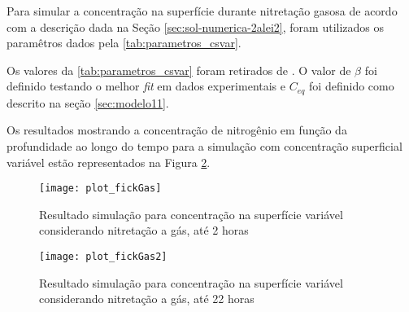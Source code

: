 Para simular a concentração na superfície durante nitretação gasosa de acordo com a descrição dada na Seção \autoref{sec:sol-numerica-2alei2}, foram utilizados os paramêtros dados pela \autoref{tab:parametros_csvar}.

\begin{table}[ht]
\centering
\setlength{\doublerulesep}{\arrayrulewidth}
{\def\arraystretch{2}\tabcolsep=10pt
\caption{Parâmetros para concentração na superfície variável nitretação gasosa}
}
\end{table}

Os valores da \autoref{tab:parametros_csvar} foram retirados de \cite{christiansen2008nitrogen}. O valor de $\beta$ foi definido testando o melhor \textit{fit} em dados experimentais e $C_{eq}$ foi definido como descrito na seção \autoref{sec:modelo11}.

Os resultados mostrando a concentração de nitrogênio em função da profundidade ao longo do tempo para a simulação com concentração superficial variável estão representados na Figura \ref{fig:csvar-gas}.

\begin{figure}[ht]
\centering
	\caption{Resultado simulação para concentração na superfície variável considerando nitretação a gás, até 2 horas}
	\texttt{[image: plot\_fickGas]}
	\label{fig:csvar-gas}
	\centering
\end{figure}

\begin{figure}[ht]
\centering
	\caption{Resultado simulação para concentração na superfície variável considerando nitretação a gás, até 22 horas}
	\texttt{[image: plot\_fickGas2]}
	\label{fig:csvar-gas}
	\centering
\end{figure}



